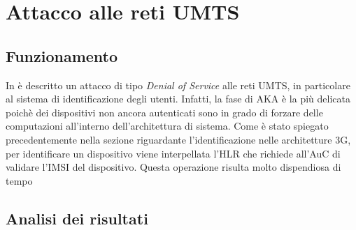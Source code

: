 \section{Attacco alle reti UMTS}
\subsection{Funzionamento}
In \cite{umts-dos} è descritto un attacco di tipo \textit{Denial of Service} alle reti UMTS, in particolare al
sistema di identificazione degli utenti. Infatti, la fase di AKA è la più delicata poichè dei dispositivi non ancora 
autenticati sono in grado di forzare delle computazioni all'interno dell'architettura di sistema. 
Come è stato spiegato precedentemente nella sezione riguardante l'identificazione nelle architetture 3G, per identificare un 
dispositivo viene interpellata l'HLR che richiede all'AuC di validare l'IMSI del dispositivo. Questa operazione risulta molto dispendiosa
di tempo 
\subsection{Analisi dei risultati}